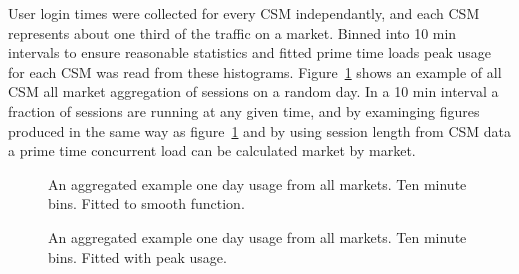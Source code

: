 \documentclass{article}
\begin{document}
User login times were collected for every CSM independantly, and each CSM represents about one third of the traffic on a market. Binned into 10 min intervals to ensure reasonable statistics and fitted prime time loads peak usage for each CSM was read from these histograms. Figure~\ref{FIGURE-DailyUse} shows an example of all CSM all market aggregation of sessions on a random day. In a 10 min interval a fraction of sessions are running at any given time, and by examinging figures produced in the same way as figure~\ref{FIGURE-DailyUse} and by using session length from CSM data a prime time concurrent load can be calculated market by market. 

\begin{figure}[!htb]
        \caption{\label{FIGURE-DailyUse} An aggregated example one day usage from all markets. Ten minute bins. Fitted to smooth function.}
      \end{figure}

\begin{figure}[!htb]
        \caption{\label{FIGURE-DailyUseWithSpikes} An aggregated example one day usage from all markets. Ten minute bins. Fitted with peak usage.}
      \end{figure}
\end{document}

